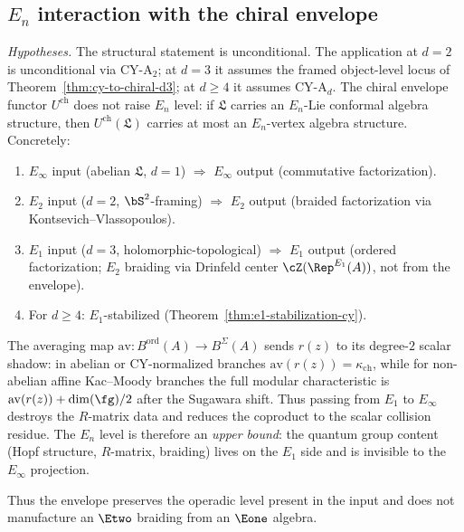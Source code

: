 \subsection{\texorpdfstring{$E_n$}{E-n} interaction with the chiral envelope}
\label{subsec:en-chiral-envelope}

\begin{proposition}
\label{prop:en-envelope-preservation}
\noindent\emph{Hypotheses.} The structural statement is unconditional. The application at $d = 2$ is unconditional via CY-A$_2$; at $d = 3$ it assumes the framed object-level locus of Theorem~\ref{thm:cy-to-chiral-d3}; at $d \geq 4$ it assumes CY-A$_d$.
The chiral envelope functor $U^{\mathrm{ch}}$ does not raise $E_n$ level: if $\mathfrak{L}$ carries an $E_n$-Lie conformal algebra structure, then $U^{\mathrm{ch}}(\mathfrak{L})$ carries at most an $E_n$-vertex algebra structure. Concretely:
\begin{enumerate}[label=\textup{(\roman*)}]
 \item $E_\infty$ input (abelian $\mathfrak{L}$, $d = 1$) $\Rightarrow$ $E_\infty$ output (commutative factorization).
 \item $E_2$ input ($d = 2$, $\bS^2$-framing) $\Rightarrow$ $E_2$ output (braided factorization via Kontsevich--Vlassopoulos).
 \item $E_1$ input ($d = 3$, holomorphic-topological) $\Rightarrow$ $E_1$ output (ordered factorization; $E_2$ braiding via Drinfeld center $\cZ(\Rep^{E_1}(A))$, not from the envelope).
 \item For $d \geq 4$: $E_1$-stabilized (Theorem~\textup{\ref{thm:e1-stabilization-cy}}).
\end{enumerate}

The averaging map $\mathrm{av} \colon B^{\mathrm{ord}}(A) \to B^{\Sigma}(A)$ sends $r(z)$ to its degree-$2$ scalar shadow: in abelian or CY-normalized branches $\mathrm{av}(r(z))=\kappa_{\mathrm{ch}}$, while for non-abelian affine Kac--Moody branches the full modular characteristic is $\mathrm{av}(r(z))+\dim(\fg)/2$ after the Sugawara shift. Thus passing from $E_1$ to $E_\infty$ destroys the $R$-matrix data and reduces the coproduct to the scalar collision residue. The $E_n$ level is therefore an \emph{upper bound}: the quantum group content (Hopf structure, $R$-matrix, braiding) lives on the $E_1$ side and is invisible to the $E_\infty$ projection.

Thus the envelope preserves the operadic level present in the input and
does not manufacture an $\Etwo$ braiding from an $\Eone$ algebra.
\end{proposition}


